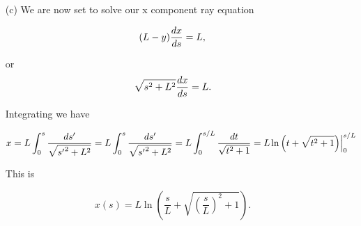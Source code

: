 {\begin{enumerate}
Let's look at the small limit where $s \ll L$  

\begin{dmath}\label{eqn:modernOpticsProblemSet1P2:250}
y(s) 
\sim L \left( 1 - \left( 1 + \inv{2} \left(\frac{s}{L}\right)^2 \right) \right),
\end{dmath}

\begin{equation}\label{eqn:modernOpticsProblemSet1P2:1890}
\boxed{
y(s) \sim -\frac{s^2}{2 L} \quad \mbox{when $ s \ll L$}.
}
\end{equation}

In the large limit for $s \gg L$ the $s^2$ term dominates, leaving

\begin{dmath}\label{eqn:modernOpticsProblemSet1P2:270}
\boxed{
y(s) \sim - s \quad \mbox{when $s \gg L$}.
}
\end{dmath}

A plot of $y/L$, $-s/L$, and $-s^2/2 L^2$ can be found in \cref{fig:modernOpticsProblemSet1:modernOpticsProblemSet1Fig2b}.


\item[(c)]
We are now set to solve our x component ray equation

\begin{dmath}\label{eqn:modernOpticsProblemSet1P2:290}
(L - y) \dds{x} = L,
\end{dmath}

or
\begin{dmath}\label{eqn:modernOpticsProblemSet1P2:310}
\sqrt{s^2 + L^2} \dds{x} = L.
\end{dmath}

Integrating we have

\begin{dmath}\label{eqn:modernOpticsProblemSet1P2:330}
x 
= L \int_0^s \frac{ds'}{\sqrt{{s'}^2 + L^2}}
= L \int_0^s \frac{ds'}{\sqrt{{s'}^2 + L^2}}
= L \int_0^{s/L} \frac{dt}{\sqrt{t^2 + 1}}
= L \evalrange{ \ln\left( t + \sqrt{ t^2 + 1} \right) }{0}{s/L}
\end{dmath}

This is

\begin{dmath}\label{eqn:modernOpticsProblemSet1P2:350}
\boxed{
x(s) = L \ln\left( \frac{s}{L} + \sqrt{ \left( \frac{s}{L} \right)^2 + 1} \right).
}
\end{dmath}


\end{enumerate}}
